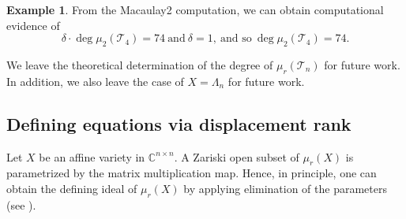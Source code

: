 \documentclass[reqno]{amsart}
\theoremstyle{definition}
\newtheorem{example}[theorem]{Example}
\numberwithin{equation}{section}
\begin{document}
\begin{example}
    From the Macaulay2 computation, we can obtain computational evidence of
    \begin{equation*}
        \delta\cdot \deg \mu_2(\mathcal{T}_4) = 74~\text{and}~\delta=1,~\text{and so}~\deg \mu_2(\mathcal{T}_4) = 74.
    \end{equation*}
\end{example}

We leave the theoretical determination of the degree of $\mu_r(\mathcal{T}_n)$ for future work. In addition, we also leave the case of $X=\Lambda_n$ for future work.


\subsection{Defining equations via displacement rank}\label{subsection:Defining equations via Displacement}

Let $X$ be an affine variety in $\mathbb{C}^{n \times n}$. A Zariski open subset of $\mu_r(X)$ is parametrized by the matrix multiplication map. Hence, in principle, one can obtain the defining ideal of $\mu_r(X)$ by applying elimination of the parameters (see \cite[Chapter 3]{MR4952933}). 
\end{document}

